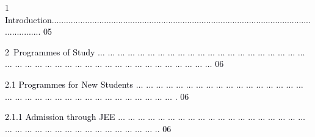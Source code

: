 \documentclass[12pt]{article}
\begin{document}
\vspace{\baselineskip}
{\fontsize{9pt}{10.8pt}\selectfont \textcolor[HTML]{00000A}{1 Introduction............................................................................................................................ 05}\par}\par


\vspace{\baselineskip}
{\fontsize{7pt}{8.4pt}\selectfont \textcolor[HTML]{00000A}{2\ Programmes of Study $ \ldots $ $ \ldots $ $ \ldots $ $ \ldots $ $ \ldots $ $ \ldots $ $ \ldots $ $ \ldots $ $ \ldots $ $ \ldots $ $ \ldots $ $ \ldots $ $ \ldots $ $ \ldots $ $ \ldots $ $ \ldots $ $ \ldots $ $ \ldots $ $ \ldots $ $ \ldots $ $ \ldots $ $ \ldots $ $ \ldots $ $ \ldots $ $ \ldots $ $ \ldots $ $ \ldots $ $ \ldots $ $ \ldots $ $ \ldots $ $ \ldots $ $ \ldots $ $ \ldots $ $ \ldots $ $ \ldots $ $ \ldots $ $ \ldots $ $ \ldots $ $ \ldots $ $ \ldots $ $ \ldots $ $ \ldots $   06}\par}\par


\vspace{\baselineskip}
\begin{adjustwidth}{0.21in}{0.0in}
{\fontsize{7pt}{8.4pt}\selectfont \textcolor[HTML]{00000A}{2.1 Programmes for New Students $ \ldots $ $ \ldots $ $ \ldots $ $ \ldots $ $ \ldots $ $ \ldots $ $ \ldots $ $ \ldots $ $ \ldots $ $ \ldots $ $ \ldots $ $ \ldots $ $ \ldots $ $ \ldots $ $ \ldots $ $ \ldots $ $ \ldots $ $ \ldots $ $ \ldots $ $ \ldots $ $ \ldots $ $ \ldots $ $ \ldots $ $ \ldots $ $ \ldots $ $ \ldots $ $ \ldots $ $ \ldots $ $ \ldots $ $ \ldots $ $ \ldots $ $ \ldots $ $ \ldots $ $ \ldots $ . 06}\par}\par

\end{adjustwidth}


\vspace{\baselineskip}
\begin{adjustwidth}{0.5in}{0.0in}
{\fontsize{7pt}{8.4pt}\selectfont \textcolor[HTML]{00000A}{2.1.1 Admission through JEE $ \ldots $ $ \ldots $ $ \ldots $ $ \ldots $ $ \ldots $ $ \ldots $ $ \ldots $ $ \ldots $ $ \ldots $ $ \ldots $ $ \ldots $ $ \ldots $ $ \ldots $ $ \ldots $ $ \ldots $ $ \ldots $ $ \ldots $ $ \ldots $ $ \ldots $ $ \ldots $ $ \ldots $ $ \ldots $ $ \ldots $ $ \ldots $ $ \ldots $ $ \ldots $ $ \ldots $ $ \ldots $ $ \ldots $ $ \ldots $ $ \ldots $ $ \ldots $ $ \ldots $ $ \ldots $ .. 06}\par}\par

\end{adjustwidth}
\end{document}
